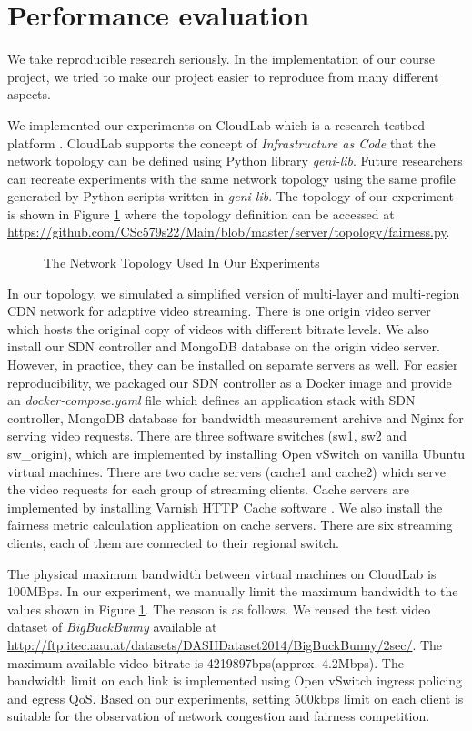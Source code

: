 \documentclass[12pt]{article}
\begin{document}
\section{Performance evaluation}

We take reproducible research seriously. In the implementation of our course project, we tried to make our project easier to reproduce from many different aspects.

We implemented our experiments on CloudLab which is a research testbed platform \cite{Ricci2014IntroducingCS}. CloudLab supports the concept of \textit{Infrastructure as Code} that the network topology can be defined using Python library \textit{geni-lib}. Future researchers can recreate experiments with the same network topology using the same profile generated by Python scripts written in \textit{geni-lib}. The topology of our experiment is shown in Figure \ref{fig:ourarch} where the topology definition can be accessed at \url{https://github.com/CSc579s22/Main/blob/master/server/topology/fairness.py}.

\begin{figure}[H]
\centering

\caption{The Network Topology Used In Our Experiments}
\label{fig:ourarch}
\end{figure}

In our topology, we simulated a simplified version of multi-layer and multi-region CDN network for adaptive video streaming. There is one origin video server which hosts the original copy of videos with different bitrate levels. We also install our SDN controller and MongoDB database on the origin video server. However, in practice, they can be installed on separate servers as well. For easier reproducibility, we packaged our SDN controller as a Docker image and provide an \textit{docker-compose.yaml} file which defines an application stack with SDN controller, MongoDB database for bandwidth measurement archive and Nginx for serving video requests. There are three software switches (sw1, sw2 and sw\_origin), which are implemented by installing Open vSwitch on vanilla Ubuntu virtual machines. There are two cache servers (cache1 and cache2) which serve the video requests for each group of streaming clients. Cache servers are implemented by installing Varnish HTTP Cache software \cite{varnish}. We also install the fairness metric calculation application on cache servers. There are six streaming clients, each of them are connected to their regional switch.

The physical maximum bandwidth between virtual machines on CloudLab is 100MBps. In our experiment, we manually limit the maximum bandwidth to the values shown in Figure \ref{fig:ourarch}. The reason is as follows. We reused the test video dataset of \textit{BigBuckBunny} available at \url{http://ftp.itec.aau.at/datasets/DASHDataset2014/BigBuckBunny/2sec/}. The maximum available video bitrate is 4219897bps(approx. 4.2Mbps). The bandwidth limit on each link is implemented using Open vSwitch ingress policing and egress QoS. Based on our experiments, setting 500kbps limit on each client is suitable for the observation of network congestion and fairness competition. 
\end{document}
